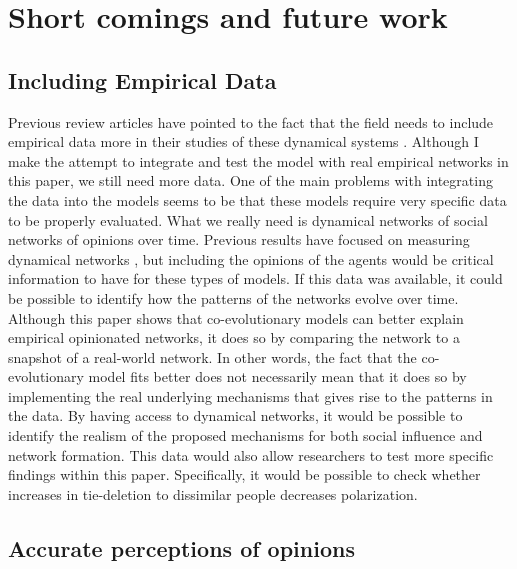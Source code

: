 \documentclass{article}
\begin{document}
\section{Short comings and future work}

\subsection{Including Empirical Data}

Previous review articles have pointed to the fact that the field needs to include empirical data more in their studies of these dynamical systems \cite{flache_models_2017,noorazar_classical_2020,sirbu2017opinion}. Although I make the attempt to integrate and test the model with real empirical networks in this paper, we still need more data. One of the main problems with integrating the data into the models seems to be that these models require very specific data to be properly evaluated. What we really need is dynamical networks of social networks of opinions over time. Previous results have focused on measuring dynamical networks \cite{kossinets_origins_2009}, but including the opinions of the agents would be critical information to have for these types of models. If this data was available, it could be possible to identify how the patterns of the networks evolve over time. Although this paper shows that co-evolutionary models can better explain empirical opinionated networks, it does so by comparing the network to a snapshot of a real-world network. In other words, the fact that the co-evolutionary model fits better does not necessarily mean that it does so by implementing the real underlying mechanisms that gives rise to the patterns in the data. By having access to dynamical networks, it would be possible to identify the realism of the proposed mechanisms for both social influence and network formation. This data would also allow researchers to test more specific findings within this paper. Specifically, it would be possible to check whether increases in tie-deletion to dissimilar people decreases polarization. 

\subsection{Accurate perceptions of opinions}
\end{document}
